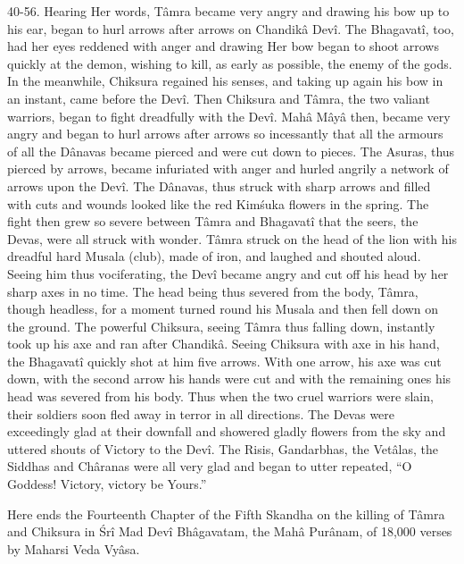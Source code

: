 40-56. Hearing Her words, T\^amra became very angry and drawing his bow up to his ear, began to hurl arrows after arrows on Chandik\^a Dev\^i. The Bhagavat\^i, too, had her eyes reddened with anger and drawing Her bow began to shoot arrows quickly at the demon, wishing to kill, as early as possible, the enemy of the gods. In the meanwhile, Chiksura regained his senses, and taking up again his bow in an instant, came before the Dev\^i. Then Chiksura and T\^amra, the two valiant warriors, began to fight dreadfully with the Dev\^i. Mah\^a M\^ay\^a then, became very angry and began to hurl arrows after arrows so incessantly that all the armours of all the D\^anavas became pierced and were cut down to pieces. The Asuras, thus pierced by arrows, became infuriated with anger and hurled angrily a network of arrows upon the Dev\^i. The D\^anavas, thus struck with sharp arrows and filled with cuts and wounds looked like the red Kim\'suka flowers in the spring. The fight then grew so severe between T\^amra and Bhagavat\^i that the seers, the Devas, were all struck with wonder. T\^amra struck on the head of the lion with his dreadful hard Musala (club), made of iron, and laughed and shouted aloud. Seeing him thus vociferating, the Dev\^i became angry and cut off his head by her sharp axes in no time. The head being thus severed from the body, T\^amra, though headless, for a moment turned round his Musala and then fell down on the ground. The powerful Chiksura, seeing T\^amra thus falling down, instantly took up his axe and ran after Chandik\^a. Seeing Chiksura with axe in his hand, the Bhagavat\^i quickly shot at him five arrows. With one arrow, his axe was cut down, with the second arrow his hands were cut and with the remaining ones his head was severed from his body. Thus when the two cruel warriors were slain, their soldiers soon fled away in terror in all directions. The Devas were exceedingly glad at their downfall and showered gladly flowers from the sky and uttered shouts of Victory to the Dev\^i. The Risis, Gandarbhas, the Vet\^alas, the Siddhas and Ch\^aranas were all very glad and began to utter repeated, ``O Goddess! Victory, victory be Yours.''

Here ends the Fourteenth Chapter of the Fifth Skandha on the killing of T\^amra and Chiksura in \'Sr\^i Mad Dev\^i Bh\^agavatam, the Mah\^a Pur\^anam, of 18,000 verses by Maharsi Veda Vy\^asa.